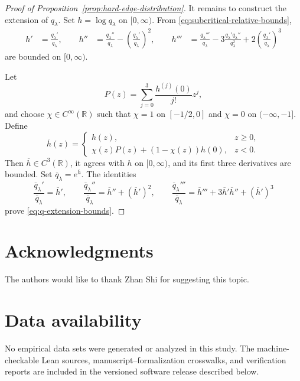\documentclass[a4paper,fleqn]{cas-sc}
\newif\ifshowrevisions
\newenvironment{revision}{\begingroup\ifshowrevisions\color{blue}\fi}{\endgroup}
\numberwithin{equation}{section}
\theoremstyle{plain}
\theoremstyle{definition}
\begin{document}
\begin{proof}[Proof of Proposition~\ref{prop:hard-edge-distribution}]
It remains to construct the extension of $q_{\lambda}$.  Set
$h=\log q_{\lambda}$ on $[0,\infty)$.  From
\eqref{eq:subcritical-relative-bounds},
\[
\begin{aligned}
 h'&=\frac{q_{\lambda}'}{q_{\lambda}},\qquad
 h''&=\frac{q_{\lambda}''}{q_{\lambda}}
      -\left(\frac{q_{\lambda}'}{q_{\lambda}}\right)^2,\qquad
 h'''&=\frac{q_{\lambda}'''}{q_{\lambda}}
      -3\frac{q_{\lambda}'q_{\lambda}''}{q_{\lambda}^2}
      +2\left(\frac{q_{\lambda}'}{q_{\lambda}}\right)^3
\end{aligned}
\]
are bounded on $[0,\infty)$.

 Let
\[
 P(z)=\sum_{j=0}^3\frac{h^{(j)}(0)}{j!}z^j,
\]
and choose $\chi\in C^\infty(\mathbb R)$ such that
$\chi=1$ on $[-1/2,0]$ and $\chi=0$ on $(-\infty,-1]$.  Define
\[
 \overline h(z)=
 \begin{cases}
  h(z),&z\ge0,\\
  \chi(z)P(z)+(1-\chi(z))h(0),&z<0.
 \end{cases}
\]
Then $\overline h\in C^3(\mathbb R)$, it agrees with $h$ on
$[0,\infty)$, and its first three derivatives are bounded.  Set
$\overline q_{\lambda}=e^{\overline h}$.  The identities
\[
 {
 \frac{\overline q_{\lambda}'}{\overline q_{\lambda}}
 =\overline h',
 \qquad
 \frac{\overline q_{\lambda}''}{\overline q_{\lambda}}
 =\overline h''+(\overline h')^2,
 \qquad
 \frac{\overline q_{\lambda}'''}{\overline q_{\lambda}}
 =\overline h'''+3\overline h'\overline h''+(\overline h')^3}
\]
prove \eqref{eq:q-extension-bounds}.
\end{proof}


\section*{Acknowledgments}
The authors would like to thank Zhan Shi for suggesting this topic.

\section*{Data availability}
\begin{revision}
No empirical data sets were generated or analyzed in this study.  The
machine-checkable Lean sources, manuscript--formalization crosswalks, and
verification reports are included in the versioned software release described
below.
\end{revision}
\end{document}
